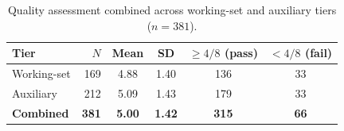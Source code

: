 \begin{table}[htbp]
\centering
\caption{Quality assessment combined across working-set and auxiliary tiers ($n = 381$).}
\label{tab:qa-combined}
\begin{tabular}{lrcccc}
\toprule
Tier & $N$ & Mean & SD & $\geq 4/8$ (pass) & $< 4/8$ (fail) \\
\midrule
Working-set & 169 & 4.88 & 1.40 & 136 & 33 \\
Auxiliary   & 212 & 5.09 & 1.43 & 179 & 33 \\
\midrule
\textbf{Combined} & \textbf{381} & \textbf{5.00} & \textbf{1.42} & \textbf{315} & \textbf{66} \\
\bottomrule
\end{tabular}
\end{table}